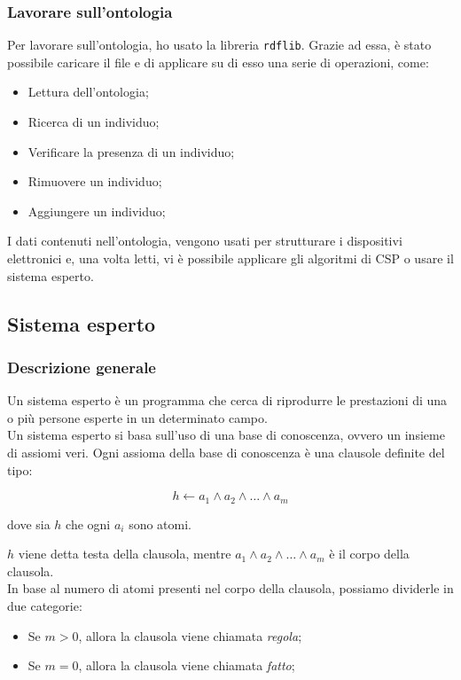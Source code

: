 \documentclass[12pt, letterpaper]{article}
\begin{document}
\subsubsection{Lavorare sull'ontologia}

Per lavorare sull'ontologia, ho usato la libreria \texttt{rdflib}. Grazie ad essa, è stato possibile
caricare il file  e di applicare su di esso una serie di operazioni, come:

\begin{itemize}
      \item Lettura dell'ontologia;
      \item Ricerca di un individuo;
      \item Verificare la presenza di un individuo;
      \item Rimuovere un individuo;
      \item Aggiungere un individuo;
\end{itemize}

\noindent I dati contenuti nell'ontologia, vengono usati per strutturare i dispositivi elettronici e, una volta
letti, vi è possibile applicare gli algoritmi di CSP o usare il sistema esperto.

\subsection{Sistema esperto}

\subsubsection{Descrizione generale}

\noindent Un sistema esperto è un programma che cerca di riprodurre le prestazioni di una o più
persone esperte in un determinato campo. \\

\noindent Un sistema esperto si basa sull'uso di una base di conoscenza, ovvero un insieme
di assiomi veri. Ogni assioma della base di conoscenza è una clausole definite del tipo:

\[ h \leftarrow a_1 \land  a_2 \land \dots \land a_m \]

\noindent dove sia $h$ che ogni $a_i$ sono atomi.

\noindent $h$ viene detta testa della clausola, mentre
$a_1 \land  a_2 \land \dots \land a_m$ è il corpo della clausola. \\

\noindent In base al numero di atomi presenti nel corpo della clausola, possiamo dividerle in due categorie:
\begin{itemize}
      \item Se $m > 0$, allora la clausola viene chiamata \textit{regola};
      \item Se $m = 0$, allora la clausola viene chiamata \textit{fatto};
\end{itemize}
\end{document}
